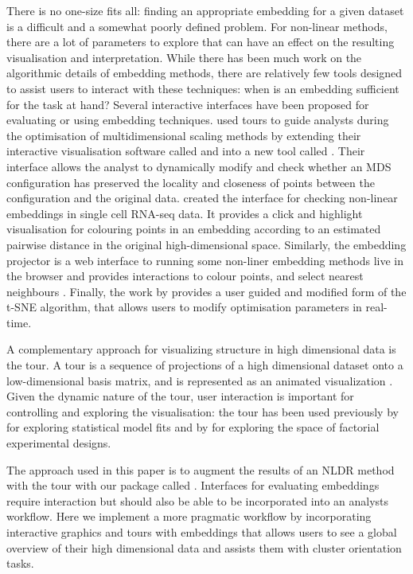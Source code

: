 \documentclass[article,notitle]{jdssv}
\begin{document}
There is no one-size fits all: finding an appropriate embedding for a given
dataset is a difficult and a somewhat poorly defined problem. For non-linear
methods, there are a lot of parameters to explore that can have an effect on
the resulting visualisation and interpretation.
While there has been much work on the algorithmic details of
embedding methods, there are relatively few tools designed to assist users
to interact with these techniques: when is an embedding sufficient for the
task at hand? Several
interactive interfaces have been proposed for evaluating or using embedding
techniques. \citet{Buja2008-fn} used tours to guide analysts during the optimisation
of multidimensional scaling methods by extending their interactive visualisation
software called  and  into a new tool called 
\citep{Swayne1998-uq, Swayne2003-qd, Swayne2004-ua}.
Their interface allows the analyst to dynamically modify and check whether
an MDS configuration has preserved the locality and closeness
of points between the configuration and the original data.
\citet{Ovchinnikova2020-sy} created the  interface for checking
non-linear embeddings in single cell RNA-seq data. It provides a click and
highlight visualisation for colouring points in an embedding according to an
estimated pairwise distance in the original high-dimensional space.
Similarly, the  embedding projector is a web interface to
running some non-liner embedding methods live in the browser and
provides interactions to colour points, and select nearest neighbours
\citep{Smilkov2016-hp}. Finally, the work by \citet{Pezzotti2017-cz} provides a user
guided and modified form of the t-SNE algorithm, that allows users to modify
optimisation parameters in real-time.

A complementary approach for visualizing structure in high dimensional data is
the tour. A tour is a sequence of projections of a high dimensional dataset
onto a low-dimensional basis matrix, and is represented as an
animated visualization \citep{Asimov1985-vp, Buja1986-zr}. Given the dynamic
nature of the tour, user interaction is important for controlling and
exploring the visualisation: the tour has been used previously by
\citet{Wickham2015-cx} for exploring statistical model fits and by \citet{Buja1996-fk} for
exploring the space of factorial experimental designs.

The approach used in this paper is to augment the results of an NLDR method with the tour with our  package called . Interfaces for evaluating
embeddings require interaction but should also be able to be incorporated into
an analysts workflow. Here we implement a more pragmatic workflow by
incorporating interactive graphics and tours with embeddings that allows users
to see a global overview of their high dimensional data and assists them with cluster orientation tasks.
\end{document}
